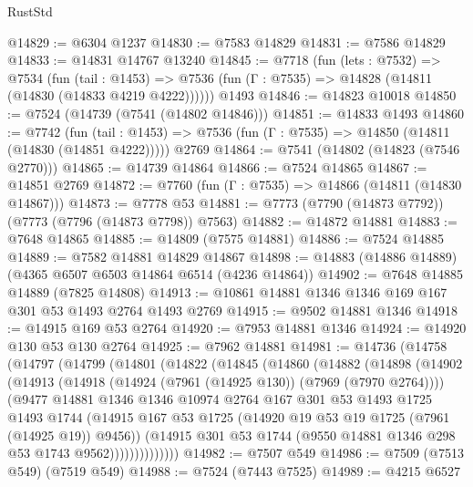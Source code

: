 \begin{lexlean}{RustStd}
\begin{coremodule}
@14829 := @6304 @1237
@14830 := @7583 @14829
@14831 := @7586 @14829
@14833 := @14831 @14767 @13240
@14845 := @7718
    (fun (lets : @7532) =>
    @7534
      (fun (tail : @1453) =>
      @7536 (fun (Γ : @7535) => @14828 (@14811 (@14830 (@14833 @4219 @4222))))))
    @1493
@14846 := @14823 @10018
@14850 := @7524 (@14739 (@7541 (@14802 @14846)))
@14851 := @14833 @1493
@14860 := @7742
    (fun (tail : @1453) => @7536 (fun (Γ : @7535) => @14850 (@14811 (@14830 (@14851 @4222)))))
    @2769
@14864 := @7541 (@14802 (@14823 (@7546 @2770)))
@14865 := @14739 @14864
@14866 := @7524 @14865
@14867 := @14851 @2769
@14872 := @7760 (fun (Γ : @7535) => @14866 (@14811 (@14830 @14867)))
@14873 := @7778 @53
@14881 := @7773 (@7790 (@14873 @7792)) (@7773 (@7796 (@14873 @7798)) @7563)
@14882 := @14872 @14881
@14883 := @7648 @14865
@14885 := @14809 (@7575 @14881)
@14886 := @7524 @14885
@14889 := @7582 @14881 @14829 @14867
@14898 := @14883 (@14886 @14889) (@4365 @6507 @6503 @14864 @6514 (@4236 @14864))
@14902 := @7648 @14885 @14889 (@7825 @14808)
@14913 := @10861 @14881 @1346 @1346 @169 @167 @301 @53 @1493 @2764 @1493 @2769
@14915 := @9502 @14881 @1346
@14918 := @14915 @169 @53 @2764
@14920 := @7953 @14881 @1346
@14924 := @14920 @130 @53 @130 @2764
@14925 := @7962 @14881
@14981 := @14736
    (@14758
      (@14797
        (@14799
          (@14801
            (@14822
              (@14845
                (@14860
                  (@14882
                    (@14898
                      (@14902
                        (@14913
                          (@14918 (@14924 (@7961 (@14925 @130)) (@7969 (@7970 @2764))))
                          (@9477
                            @14881
                            @1346
                            @1346
                            @10974
                            @2764
                            @167
                            @301
                            @53
                            @1493
                            @1725
                            @1493
                            @1744
                            (@14915
                              @167
                              @53
                              @1725
                              (@14920 @19 @53 @19 @1725 (@7961 (@14925 @19)) @9456))
                            (@14915
                              @301
                              @53
                              @1744
                              (@9550 @14881 @1346 @298 @53 @1743 @9562))))))))))))))
@14982 := @7507 @549
@14986 := @7509 (@7513 @549) (@7519 @549)
@14988 := @7524 (@7443 @7525)
@14989 := @4215 @6527

\end{coremodule}
\end{lexlean}
